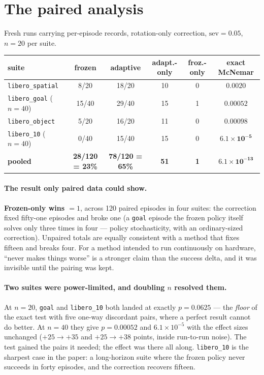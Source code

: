 \documentclass[11pt,a4paper]{article}
\newcommand{\code}[1]{\texttt{\small #1}}
\begin{document}
\section{The paired analysis}
\label{sec:paired}

Fresh runs carrying per-episode records, rotation-only correction, $\mathrm{sev} = 0.05$,
$n = 20$ per suite.

{\small
\begin{center}
\begin{tabular}{lccccc}
\toprule
suite & frozen & adaptive & adapt.-only & froz.-only & exact McNemar \\
\midrule
\code{libero\_spatial} & 8/20 & 18/20 & 10 & 0 & $\mathbf{0.0020}$ \\
\code{libero\_goal} ($n{=}40$)    & 15/40 & 29/40 & 15 & 1 & $\mathbf{0.00052}$ \\
\code{libero\_object}  & 5/20 & 16/20 & 11 & 0 & $\mathbf{0.00098}$ \\
\code{libero\_10} ($n{=}40$)      & 0/40 & 15/40 & 15 & 0 & $\mathbf{6.1\times 10^{-5}}$ \\
\midrule
\textbf{pooled} & \textbf{28/120 = 23\%} & \textbf{78/120 = 65\%} & \textbf{51} & \textbf{1}
  & $\mathbf{6.1\times 10^{-13}}$ \\
\bottomrule
\end{tabular}
\end{center}
}

\paragraph{The result only paired data could show.}
\textbf{Frozen-only wins $= 1$}, across 120 paired episodes in four suites: the
correction fixed fifty-one episodes and broke one (a \code{goal} episode the frozen policy
itself solves only three times in four --- policy stochasticity, with an ordinary-sized
correction). Unpaired totals are equally consistent with a method
that fixes fifteen and breaks four. For a method intended to run continuously on hardware,
``never makes things worse'' is a stronger claim than the success delta, and it was
invisible until the pairing was kept.

\paragraph{Two suites were power-limited, and doubling $n$ resolved them.}
At $n = 20$, \code{goal} and \code{libero\_10} both landed at exactly $p = 0.0625$ --- the
\emph{floor} of the exact test with five one-way discordant pairs, where a perfect result
cannot do better. At $n = 40$ they give $p = 0.00052$ and $6.1\times 10^{-5}$ with the
effect sizes unchanged ($+25 \to +35$ and $+25 \to +38$ points, inside run-to-run noise).
The test gained the pairs it needed; the effect was there all along. \code{libero\_10} is
the sharpest case in the paper: a long-horizon suite where the frozen policy never
succeeds in forty episodes, and the correction recovers fifteen.
\end{document}

